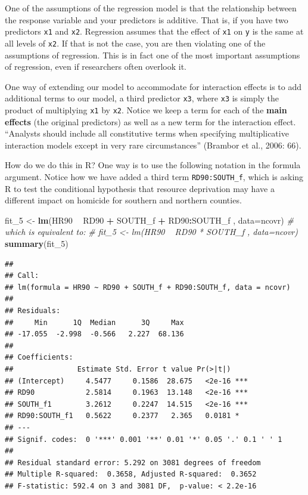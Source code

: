 \documentclass[]{book}
\newenvironment{Shaded}{\begin{snugshade}}{\end{snugshade}}
\newcommand{\CommentTok}[1]{\textcolor[rgb]{0.56,0.35,0.01}{\textit{#1}}}
\newcommand{\DataTypeTok}[1]{\textcolor[rgb]{0.13,0.29,0.53}{#1}}
\newcommand{\DecValTok}[1]{\textcolor[rgb]{0.00,0.00,0.81}{#1}}
\newcommand{\KeywordTok}[1]{\textcolor[rgb]{0.13,0.29,0.53}{\textbf{#1}}}
\newcommand{\NormalTok}[1]{#1}
\newcommand{\OperatorTok}[1]{\textcolor[rgb]{0.81,0.36,0.00}{\textbf{#1}}}
\newcommand{\StringTok}[1]{\textcolor[rgb]{0.31,0.60,0.02}{#1}}
\begin{document}
One of the assumptions of the regression model is that the relationship between the response variable and your predictors is additive. That is, if you have two predictors \texttt{x1} and \texttt{x2}. Regression assumes that the effect of \texttt{x1} on \texttt{y} is the same at all levels of \texttt{x2}. If that is not the case, you are then violating one of the assumptions of regression. This is in fact one of the most important assumptions of regression, even if researchers often overlook it.

One way of extending our model to accommodate for interaction effects is to add additional terms to our model, a third predictor \texttt{x3}, where \texttt{x3} is simply the product of multiplying \texttt{x1} by \texttt{x2}. Notice we keep a term for each of the \textbf{main effects} (the original predictors) as well as a new term for the interaction effect. ``Analysts should include all constitutive terms when specifying multiplicative interaction models except in very rare circumstances'' (Brambor et al., 2006: 66).

How do we do this in R? One way is to use the following notation in the formula argument. Notice how we have added a third term \texttt{RD90:SOUTH\_f}, which is asking R to test the conditional hypothesis that resource deprivation may have a different impact on homicide for southern and northern counties.

\begin{Shaded}
\begin{Highlighting}[]
\NormalTok{fit_}\DecValTok{5}\NormalTok{ <-}\StringTok{ }\KeywordTok{lm}\NormalTok{(HR90 }\OperatorTok{~}\StringTok{ }\NormalTok{RD90 }\OperatorTok{+}\StringTok{ }\NormalTok{SOUTH_f }\OperatorTok{+}\StringTok{ }\NormalTok{RD90}\OperatorTok{:}\NormalTok{SOUTH_f , }\DataTypeTok{data=}\NormalTok{ncovr)}
\CommentTok{# which is equivalent to: }
\CommentTok{# fit_5 <- lm(HR90 ~ RD90 * SOUTH_f , data=ncovr)}
\KeywordTok{summary}\NormalTok{(fit_}\DecValTok{5}\NormalTok{)}
\end{Highlighting}
\end{Shaded}

\begin{verbatim}
## 
## Call:
## lm(formula = HR90 ~ RD90 + SOUTH_f + RD90:SOUTH_f, data = ncovr)
## 
## Residuals:
##     Min      1Q  Median      3Q     Max 
## -17.055  -2.998  -0.566   2.227  68.136 
## 
## Coefficients:
##               Estimate Std. Error t value Pr(>|t|)    
## (Intercept)     4.5477     0.1586  28.675   <2e-16 ***
## RD90            2.5814     0.1963  13.148   <2e-16 ***
## SOUTH_f1        3.2612     0.2247  14.515   <2e-16 ***
## RD90:SOUTH_f1   0.5622     0.2377   2.365   0.0181 *  
## ---
## Signif. codes:  0 '***' 0.001 '**' 0.01 '*' 0.05 '.' 0.1 ' ' 1
## 
## Residual standard error: 5.292 on 3081 degrees of freedom
## Multiple R-squared:  0.3658, Adjusted R-squared:  0.3652 
## F-statistic: 592.4 on 3 and 3081 DF,  p-value: < 2.2e-16
\end{verbatim}
\end{document}
